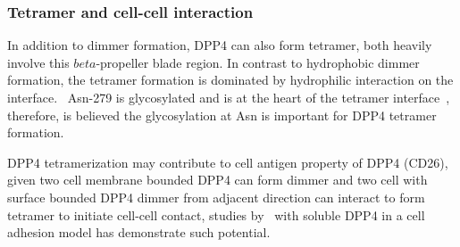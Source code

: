 \subsubsection{Tetramer and cell-cell interaction}

In addition to dimmer formation, DPP4 can also form tetramer, both heavily involve this $beta$-propeller blade region. In contrast to hydrophobic dimmer formation, the tetramer formation is dominated by hydrophilic interaction on the interface.~\cite{Engel_2003} Asn-279 is glycosylated and is at the heart of the tetramer interface~\cite{Engel_2003}, therefore, is believed the glycosylation at Asn is important for DPP4 tetramer formation. 
\par 
DPP4 tetramerization may contribute to cell antigen property of DPP4 (CD26), given two cell membrane bounded DPP4 can form dimmer and two cell with surface bounded DPP4 dimmer from adjacent direction can interact to form tetramer to initiate cell-cell contact, studies by~\cite{Cheng1998,Abdel-Ghany1998} with soluble DPP4 in a cell adhesion model has demonstrate such potential. 